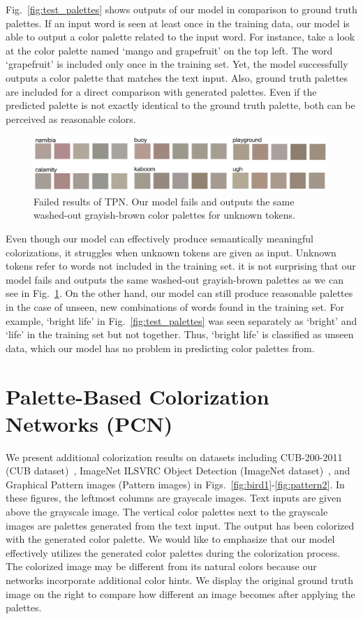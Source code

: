 \documentclass[runningheads]{llncs}
\begin{document}
Fig.~\ref{fig:test_palettes} shows outputs of our model in comparison to ground truth palettes. If an input word is seen at least once in the training data, our model is able to output a color palette related to the input word. For instance, take a look at the color palette named `mango and grapefruit' on the top left. The word `grapefruit' is included only once in the training set. Yet, the model successfully outputs a color palette that matches the text input. Also, ground truth palettes are included for a direct comparison with generated palettes. Even if the predicted palette is not exactly identical to the ground truth palette, both can be perceived as reasonable colors.
\begin{figure}[h!]
\centering 
\includegraphics[width=0.99\textwidth]{./failure_cases.png}
\vspace*{-2mm}\caption{Failed results of TPN. Our model fails and outputs the same washed-out grayish-brown color palettes for unknown tokens.}\label{fig:failure_cases}
\end{figure} 
Even though our model can effectively produce semantically meaningful colorizations, it struggles when unknown tokens are given as input. Unknown tokens refer to words not included in the training set. it is not surprising that our model fails and outputs the same washed-out grayish-brown palettes as we can see in Fig.~\ref{fig:failure_cases}. On the other hand, our model can still produce reasonable palettes in the case of unseen, new combinations of words found in the training set. For example, `bright life' in Fig.~\ref{fig:test_palettes} was seen separately as `bright' and `life' in the training set but not together. Thus, `bright life' is classified as unseen data, which our model has no problem in predicting color palettes from.


\section{Palette-Based Colorization Networks (PCN)}
We present additional colorization results on datasets including CUB-200-2011 (CUB dataset)~\cite{WahCUB_200_2011}, ImageNet ILSVRC Object Detection (ImageNet dataset)~\cite{russakovsky2015imagenet}, and Graphical Pattern images (Pattern images) in Figs.~\ref{fig:bird1}-\ref{fig:pattern2}. In these figures, the leftmost columns are grayscale images. Text inputs are given above the grayscale image. The vertical color palettes next to the grayscale images are palettes generated from the text input. The output has been colorized with the generated color palette. We would like to emphasize that our model effectively utilizes the generated color palettes during the colorization process. The colorized image may be different from its natural colors because our networks incorporate additional color hints. We display the original ground truth image on the right to compare how different an image becomes after applying the palettes.  
 
\end{document}
